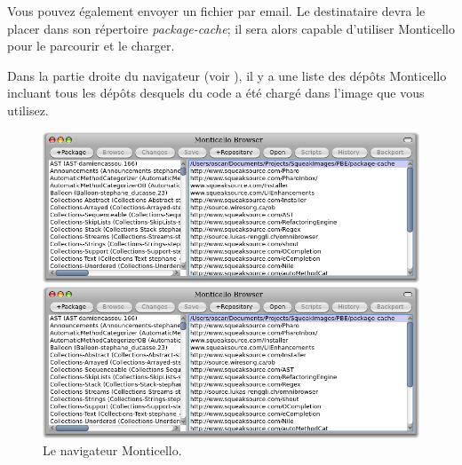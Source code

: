 \documentclass[a4paper,10pt,twoside]{book}
\begin{document}

Vous pouvez également envoyer un fichier  par email.
Le destinataire devra le placer dans son répertoire \emph{package-cache}; il sera alors capable d'utiliser Monticello pour le parcourir et le charger. 

Dans la partie droite du navigateur (voir ), il y a une liste des dépôts Monticello incluant tous les dépôts desquels du code a été chargé dans l'image que vous utilisez. 

\begin{figure}[hbt]
\ifluluelse
	{\centerline {\includegraphics[width=\textwidth]{MonticelloBrowser}}}
	{\centerline {\includegraphics[scale=0.7]{MonticelloBrowser}}}
\caption{Le navigateur Monticello.
}
\end{figure}
\end{document}
